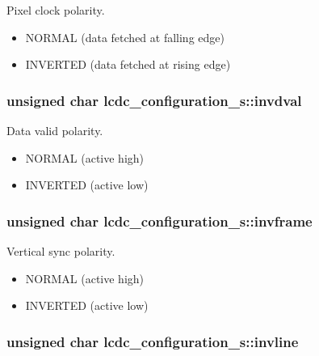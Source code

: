 Pixel clock polarity. 

\begin{itemize}
\item NORMAL (data fetched at falling edge) \item INVERTED (data fetched at rising edge) \end{itemize}
\hypertarget{structlcdc__configuration__s_911af56af449dcee1a610299619dd914}{
\subsubsection[{invdval}]{\setlength{\rightskip}{0pt plus 5cm}unsigned char {\bf lcdc\_\-configuration\_\-s::invdval}}}
\label{structlcdc__configuration__s_911af56af449dcee1a610299619dd914}


Data valid polarity. 

\begin{itemize}
\item NORMAL (active high) \item INVERTED (active low) \end{itemize}
\hypertarget{structlcdc__configuration__s_c5fc90d8386ff108dccda3269f936ea0}{
\subsubsection[{invframe}]{\setlength{\rightskip}{0pt plus 5cm}unsigned char {\bf lcdc\_\-configuration\_\-s::invframe}}}
\label{structlcdc__configuration__s_c5fc90d8386ff108dccda3269f936ea0}


Vertical sync polarity. 

\begin{itemize}
\item NORMAL (active high) \item INVERTED (active low) \end{itemize}
\hypertarget{structlcdc__configuration__s_6a43a0033a760ff44fff218c2c7e4fa6}{
\subsubsection[{invline}]{\setlength{\rightskip}{0pt plus 5cm}unsigned char {\bf lcdc\_\-configuration\_\-s::invline}}}
\label{structlcdc__configuration__s_6a43a0033a760ff44fff218c2c7e4fa6}


